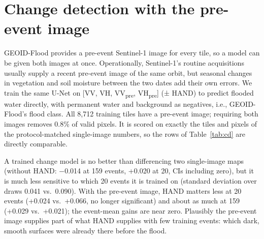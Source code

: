 \documentclass[journal,onecolumn]{IEEEtran}
\newcommand{\iouf}{IoU$_\text{flood}$}
\begin{document}
\section*{Change detection with the pre-event image}

GEOID-Flood provides a pre-event Sentinel-1 image for every tile, so a model can be given both images at
once. Operationally, Sentinel-1's routine acquisitions usually supply a recent pre-event image of the same
orbit, but seasonal changes in vegetation and soil moisture between the two dates add their own errors. We train the same U-Net on [VV, VH, VV\textsubscript{pre}, VH\textsubscript{pre}] (± HAND) to predict
flooded water directly, with permanent water and background as negatives, i.e., GEOID-Flood's flood class.
All 8,712 training tiles have a pre-event image; requiring both images removes 0.8\% of valid pixels. It
is scored on exactly the tiles and pixels of the protocol-matched single-image numbers, so the rows of
Table~\ref{tab:cd} are directly comparable.

\begin{table}[H]
\caption{HAND gain with and without the pre-event image (unseen activations; pooled \iouf{} under the
GEOID-Flood protocol, mean over draws/seeds; Δ from confusion counts averaged over draws/seeds, two-way
95\% CI; last column event-mean Δ).}
\label{tab:cd}
\centering
{}
\end{table}

A trained change model is no better than differencing two single-image maps (without HAND: −0.014 at 159
events, +0.020 at 20, CIs including zero), but it is much less sensitive to
which 20 events it is trained on (standard deviation over draws 0.041 vs.\ 0.090). With the pre-event
image, HAND matters less at 20 events (+0.024 vs.\ +0.066, no longer significant) and about as much at 159
(+0.029 vs.\ +0.021); the event-mean gains are near zero. Plausibly the pre-event image supplies part of what
HAND supplies with few training events: which dark, smooth surfaces were already there before the flood.
\end{document}
